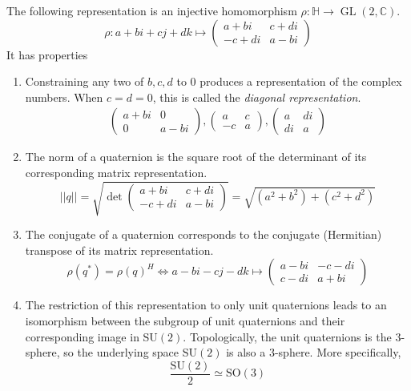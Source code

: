 \documentclass{article}
\DeclareMathOperator{\GL}{GL}
\begin{document}
      \begin{proposition}
      The following representation is an injective homomorphism $\rho: \mathbb{H} \longrightarrow \GL(2, \mathbb{C})$. 
      \[\rho: a + bi + cj + dk \mapsto \begin{pmatrix}
      a+bi & c+ di \\ -c + di & a - bi
      \end{pmatrix}\]
      It has properties
      \begin{enumerate}
          \item Constraining any two of $b, c, d$ to $0$ produces a representation of the complex numbers. When $c = d = 0$, this is called the \textit{diagonal representation}. 
          \begin{align*}
              \begin{pmatrix}
              a+bi & 0 \\ 0 & a-bi
              \end{pmatrix},  \begin{pmatrix}
              a & c \\ -c & a
              \end{pmatrix},  \begin{pmatrix}
              a & di \\ di & a
              \end{pmatrix}
          \end{align*}
          \item The norm of a quaternion is the square root of the determinant of its corresponding matrix representation. 
          \[||q|| = \sqrt{\det \begin{pmatrix}
          a+bi & c+di \\ -c+di & a-bi
          \end{pmatrix}} = \sqrt{(a^2 + b^2) + (c^2 + d^2)}\]
          \item The conjugate of a quaternion corresponds to the conjugate (Hermitian) transpose of its matrix representation. 
          \[\rho(q^*) = \rho(q)^H \iff a-bi-cj-dk \mapsto \begin{pmatrix}
          a-bi & -c-di \\ c-di & a+bi
          \end{pmatrix}\]
          \item The restriction of this representation to only unit quaternions leads to an isomorphism between the subgroup of unit quaternions and their corresponding image in SU$(2)$. Topologically, the unit quaternions is the $3$-sphere, so the underlying space SU$(2)$ is also a $3$-sphere. More specifically, 
          \[\frac{\text{SU}(2)}{2} \simeq \text{SO}(3)\]
      \end{enumerate}
      \end{proposition}
\end{document}
